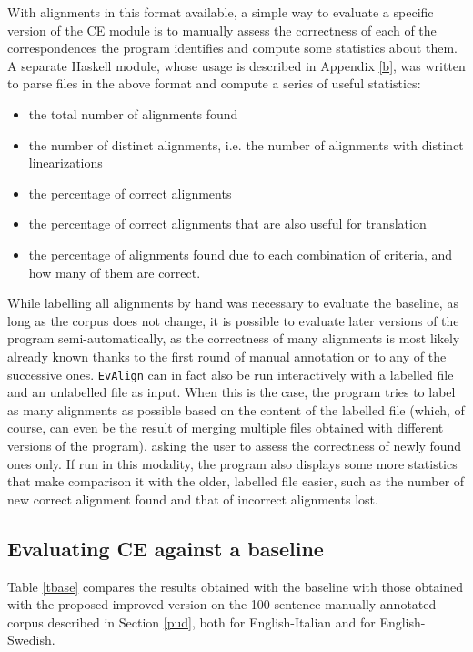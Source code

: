 With alignments in this format available, a simple way to evaluate a specific version of the CE module is to manually assess the correctness of each of the correspondences the program identifies and compute some statistics about them. 
A separate Haskell module, whose usage is described in Appendix \ref{b}, was written to parse files in the above format and compute a series of useful statistics: \smallskip
\begin{itemize}
 \item the total number of alignments found
 \item the number of distinct alignments, i.e. the number of alignments with distinct linearizations
 \item the percentage of correct alignments
 \item the percentage of correct alignments that are also useful for translation
 \item the percentage of alignments found due to each combination of criteria, and how many of them are correct.
\end{itemize} \smallskip

While labelling all alignments by hand was necessary to evaluate the baseline, as long as the corpus does not change, it is possible to evaluate later versions of the program semi-automatically, as the correctness of many alignments is most likely already known thanks to the first round of manual annotation or to any of the successive ones. \texttt{EvAlign} can in fact also be run interactively with a labelled file and an unlabelled file as input. When this is the case, the program tries to label as many alignments as possible based on the content of the labelled file (which, of course, can even be the result of merging multiple files obtained with different versions of the program), asking the user to assess the correctness of newly found ones only. If run in this modality, the program also displays some more statistics that make comparison it with the older, labelled file easier, such as the number of new correct alignment found and that of incorrect alignments lost. 

\subsection{Evaluating CE against a baseline} \label{ceres}
Table \ref{tbase} compares the results obtained with the baseline with those obtained with the proposed improved version on the 100-sentence manually annotated corpus described in Section \ref{pud}, both for English-Italian and for English-Swedish.

